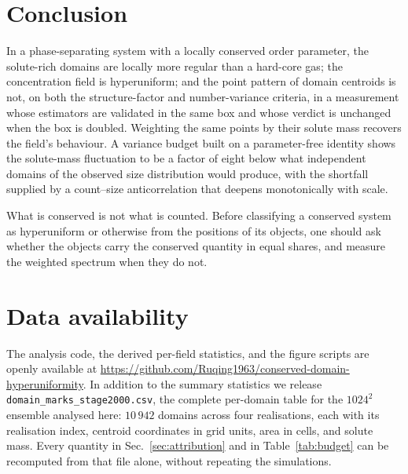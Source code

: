 \documentclass[aps,pre,twocolumn,superscriptaddress,floatfix,longbibliography]{revtex4-2}
\begin{document}
\section{Conclusion}

In a phase-separating system with a locally conserved order parameter, the
solute-rich domains are locally more regular than a hard-core gas; the
concentration field is hyperuniform; and the point pattern of domain centroids
is not, on both the structure-factor and number-variance criteria, in a
measurement whose estimators are validated in the same box and whose verdict
is unchanged when the box is doubled. Weighting the same points by their
solute mass recovers the field's behaviour. A variance budget built on a
parameter-free identity shows the solute-mass fluctuation to be a factor of
eight below what independent domains of the observed size distribution would
produce, with the shortfall supplied by a count--size anticorrelation that
deepens monotonically with scale.

What is conserved is not what is counted. Before classifying a conserved
system as hyperuniform or otherwise from the positions of its objects, one
should ask whether the objects carry the conserved quantity in equal shares,
and measure the weighted spectrum when they do not.

\section*{Data availability}

The analysis code, the derived per-field statistics, and the figure scripts
are openly available at \url{https://github.com/Ruqing1963/conserved-domain-hyperuniformity}. In addition to the summary statistics we release
\texttt{domain\_marks\_stage2000.csv}, the complete per-domain table for the
$1024^2$ ensemble analysed here: $10\,942$ domains across four realisations,
each with its realisation index, centroid coordinates in grid units, area in
cells, and solute mass. Every quantity in Sec.~\ref{sec:attribution} and in
Table~\ref{tab:budget} can be recomputed from that file alone, without
repeating the simulations.

\end{document}
